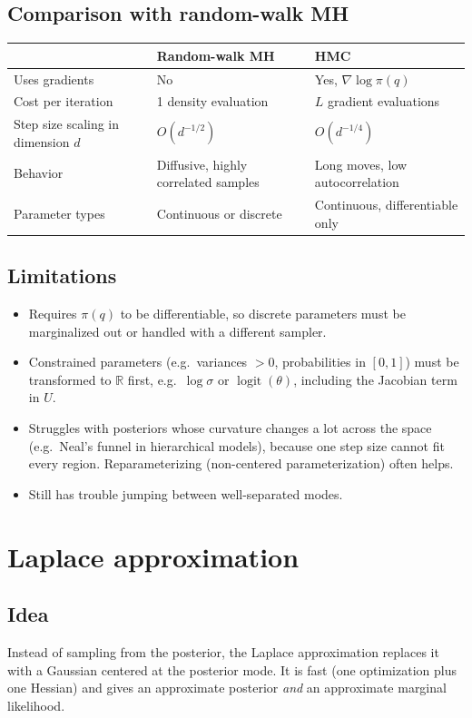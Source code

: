 \documentclass[11pt]{article}
\begin{document}
\subsection{Comparison with random-walk MH}
\begin{table}[h]
\centering
\begin{tabular}{@{}lll@{}}
\toprule
 & Random-walk MH & HMC \\
\midrule
Uses gradients & No & Yes, $\nabla \log \pi(q)$ \\
Cost per iteration & 1 density evaluation & $L$ gradient evaluations \\
Step size scaling in dimension $d$ & $O(d^{-1/2})$ & $O(d^{-1/4})$ \\
Behavior & Diffusive, highly correlated samples & Long moves, low autocorrelation \\
Parameter types & Continuous or discrete & Continuous, differentiable only \\
\bottomrule
\end{tabular}
\end{table}

\subsection{Limitations}
\begin{itemize}
    \item Requires $\pi(q)$ to be differentiable, so discrete parameters must be marginalized out or handled with a different sampler.
    \item Constrained parameters (e.g.\ variances $>0$, probabilities in $[0,1]$) must be transformed to $\mathbb{R}$ first, e.g.\ $\log \sigma$ or $\operatorname{logit}(\theta)$, including the Jacobian term in $U$.
    \item Struggles with posteriors whose curvature changes a lot across the space (e.g.\ Neal's funnel in hierarchical models), because one step size cannot fit every region. Reparameterizing (non-centered parameterization) often helps.
    \item Still has trouble jumping between well-separated modes.
\end{itemize}

\section{Laplace approximation}
\subsection{Idea}
Instead of sampling from the posterior, the Laplace approximation replaces it with a Gaussian centered at the posterior mode. It is fast (one optimization plus one Hessian) and gives an approximate posterior \emph{and} an approximate marginal likelihood.
\end{document}
